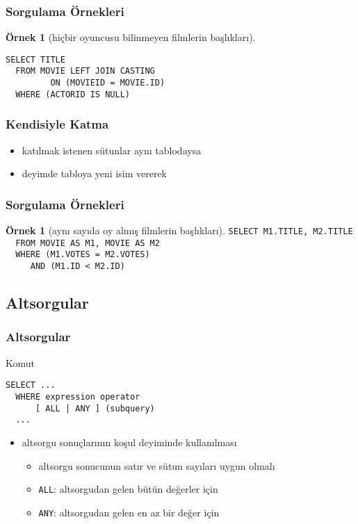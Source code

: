 \documentclass[dvipsnames]{beamer}
\theoremstyle{definition}
\theoremstyle{example}
\newtheorem{ornek}[theorem]{Örnek}
\theoremstyle{plain}
\begin{document}
\begin{frame}[fragile]
  \frametitle{Sorgulama Örnekleri}

  \begin{ornek}[hiçbir oyuncusu bilinmeyen filmlerin başlıkları]
    \begin{lstlisting}
SELECT TITLE
  FROM MOVIE LEFT JOIN CASTING
         ON (MOVIEID = MOVIE.ID)
  WHERE (ACTORID IS NULL)
    \end{lstlisting}
  \end{ornek}
\end{frame}

\begin{frame}[fragile]
  \frametitle{Kendisiyle Katma}

  \begin{itemize}
    \item katılmak istenen sütunlar aynı tablodaysa
    \item deyimde tabloya yeni isim vererek
  \end{itemize}
\end{frame}

\begin{frame}[fragile]
  \frametitle{Sorgulama Örnekleri}

  \begin{ornek}[aynı sayıda oy almış filmlerin başlıkları]
    \lstinline!SELECT M1.TITLE, M2.TITLE!\\
    \lstinline!  FROM MOVIE AS M1, MOVIE AS M2!\\
    \lstinline!  WHERE (M1.VOTES = M2.VOTES)!\\
    \pause
    \lstinline!     AND (M1.ID < M2.ID)!
  \end{ornek}
\end{frame}

\subsection{Altsorgular}

\begin{frame}[fragile]
  \frametitle{Altsorgular}

  \begin{block}{Komut}
    \begin{lstlisting}
SELECT ...
  WHERE expression operator
      [ ALL | ANY ] (subquery)
  ...
    \end{lstlisting}
  \end{block}

  \begin{itemize}
    \item altsorgu sonuçlarının koşul deyiminde kullanılması
    \pause
    \begin{itemize}
      \item altsorgu sonucunun satır ve sütun sayıları uygun olmalı
      \item \lstinline!ALL!: altsorgudan gelen bütün değerler için
      \item \lstinline!ANY!: altsorgudan gelen en az bir değer için
    \end{itemize}
  \end{itemize}
\end{frame}
\end{document}
